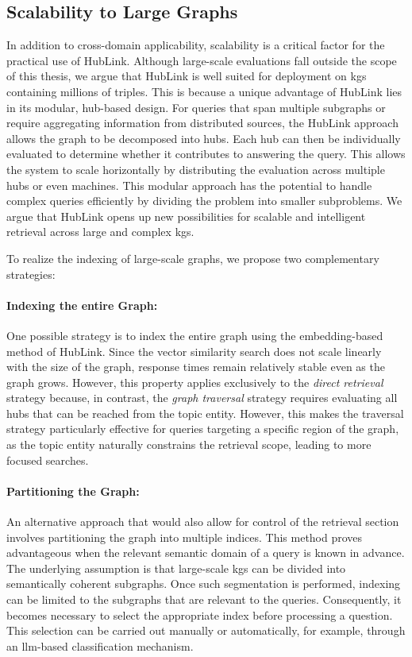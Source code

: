 \subsection{Scalability to Large Graphs}

In addition to cross-domain applicability, scalability is a critical factor for the practical use of HubLink. Although large-scale evaluations fall outside the scope of this thesis, we argue that HubLink is well suited for deployment on \glspl{kg} containing millions of triples. This is because a unique advantage of HubLink lies in its modular, hub-based design. For queries that span multiple subgraphs or require aggregating information from distributed sources, the HubLink approach allows the graph to be decomposed into hubs. Each hub can then be individually evaluated to determine whether it contributes to answering the query. This allows the system to scale horizontally by distributing the evaluation across multiple hubs or even machines. This modular approach has the potential to handle complex queries efficiently by dividing the problem into smaller subproblems. We argue that HubLink opens up new possibilities for scalable and intelligent retrieval across large and complex \glspl{kg}. 

To realize the indexing of large-scale graphs, we propose two complementary strategies:

\paragraph{Indexing the entire Graph:} 
One possible strategy is to index the entire graph using the embedding-based method of HubLink. Since the vector similarity search does not scale linearly with the size of the graph, response times remain relatively stable even as the graph grows. However, this property applies exclusively to the \emph{direct retrieval} strategy because, in contrast, the \emph{graph traversal} strategy requires evaluating all hubs that can be reached from the topic entity. However, this makes the traversal strategy particularly effective for queries targeting a specific region of the graph, as the topic entity naturally constrains the retrieval scope, leading to more focused searches.

\paragraph{Partitioning the Graph:} 
An alternative approach that would also allow for control of the retrieval section involves partitioning the graph into multiple indices. This method proves advantageous when the relevant semantic domain of a query is known in advance. The underlying assumption is that large-scale \glspl{kg} can be divided into semantically coherent subgraphs. Once such segmentation is performed, indexing can be limited to the subgraphs that are relevant to the queries. Consequently, it becomes necessary to select the appropriate index before processing a question. This selection can be carried out manually or automatically, for example, through an \gls{llm}-based classification mechanism.
